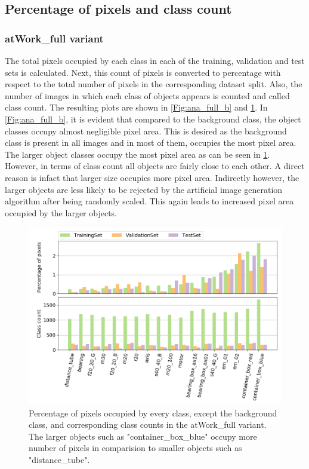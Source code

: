 	\subsection{Percentage of pixels and class count}
		
	\subsubsection{atWork\_full variant}
		The total pixels occupied by each class in each of the training, validation and test sets is calculated. Next, this count of pixels is converted to percentage with respect to the total number of pixels in the corresponding dataset split. Also, the number of images in which each class of objects appears is counted and called class count. The resulting plots are shown in \ref{Fig:ana_full_b} and \ref{Fig:ana_full}. In \ref{Fig:ana_full_b}, it is evident that compared to the background class, the object classes occupy almost negligible pixel area. This is desired as the background class is present in all images and in most of them, occupies the most pixel area. The larger object classes occupy the most pixel area as can be seen in \ref{Fig:ana_full}. However, in terms of class count all objects are fairly close to each other. A direct reason is infact that larger size occupies more pixel area. Indirectly however, the larger objects are less likely to be rejected by the artificial image generation algorithm after being randomly scaled. This again leads to increased pixel area occupied by the larger objects.
			
			\begin{figure}
			\centering
				\includegraphics[scale=0.5]{images/full_noB}
				\caption{Percentage of pixels occupied by every class, except the background class, and corresponding class counts in the atWork\_full variant. The larger objects such as "container\_box\_blue" occupy more number of pixels in comparision to smaller objects such as "distance\_tube".}
				\label{Fig:ana_full}
			\end{figure}
		
